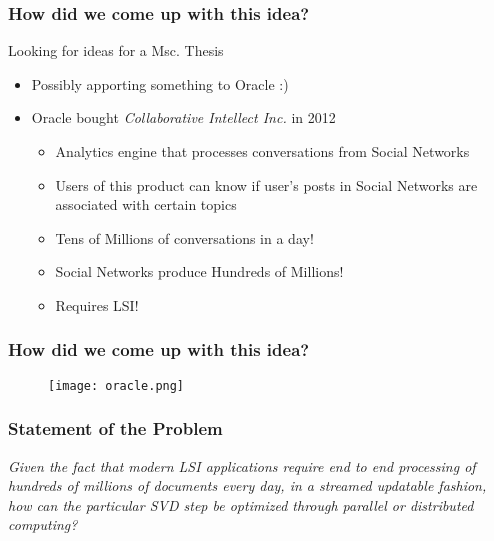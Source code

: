 \begin{frame}[plain]
  \frametitle{How did we come up with this idea?}
  \begin{block}{}
    Looking for ideas for a Msc. Thesis
    \begin{itemize}
      \item Possibly apporting something to Oracle :)
    	\item Oracle bought \textit{Collaborative Intellect Inc.} in 2012
    \begin{itemize}
      \item Analytics engine that processes conversations from Social Networks
      	\item Users of this product can know if user's posts in Social Networks are associated with certain topics
      \item Tens of Millions of conversations in a day!
      \item Social Networks produce Hundreds of Millions!
      \item Requires LSI!
    \end{itemize}
     \end{itemize}
  \end{block} 
\end{frame}
\begin{frame}[plain]
  \frametitle{How did we come up with this idea?}
\begin{center}
  \begin{figure}[H]
    \centering
    \texttt{[image: oracle.png]}
  \end{figure}
\end{center}
\end{frame}
\begin{frame}[plain]
  \frametitle{Statement of the Problem}
  \begin{block}{}
  \textit{Given the fact that modern LSI applications require end to end
processing of hundreds of millions of documents every day, in a streamed
updatable fashion, how can the particular SVD step be optimized through parallel
or distributed computing?}
  \end{block} 
\end{frame}
